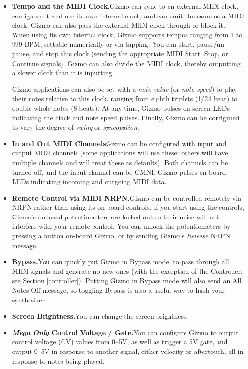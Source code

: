 \documentclass{article}
\begin{document}
\begin{itemize}
\item {\bf Tempo and the MIDI Clock.}\quad Gizmo can sync to an external MIDI clock, can ignore it and use its own internal clock, and can emit the same as a MIDI clock.  Gizmo can also pass the external MIDI clock through or block it.  When using its own internal clock, Gizmo supports tempos ranging from 1 to 999 BPM, settable numerically or via tapping.  You can start, pause/un-pause, and stop this clock (sending the appropriate MIDI Start, Stop, or Continue signals).  Gizmo can also divide the MIDI clock, thereby outputting a slower clock than it is inputting.

Gizmo applications can also be set with a {\it note value} (or {\it note speed}) to play their notes relative to this clock, ranging from eighth triplets (1/24 beat) to double whole notes (8 beats).  At any time, Gizmo pulses on-screen LEDs indicating the clock and note speed pulses.  Finally, Gizmo can be configured to vary the degree of {\it swing} or {\it syncopation}.

\item {\bf In and Out MIDI Channels}\quad Gizmo can be configured with input and output MIDI channels (some applications will use these: others will have multiple channels and will treat these as defaults).  Both channels can be turned off, and the input channel can be OMNI.  Gizmo pulses on-board LEDs indicating incoming and outgoing MIDI data.  

\item {\bf Remote Control via MIDI NRPN.}\quad Gizmo can be controlled remotely via NRPN rather than using its on-board controls.  If you start using the controls, Gizmo's onboard potentiometers are locked out so their noise will not interfere with your remote control.  You can unlock the potentiometers by pressing a button on-board Gizmo, or by sending Gizmo's {\it Release} NRPN message.

\item {\bf Bypass.}\quad You can quickly put Gizmo in Bypass mode, to pass through all MIDI signals and generate no new ones (with the exception of the Controller, see Section \ref{controller}).  Putting Gizmo in Bypass mode will also send an All Notes Off message, so toggling Bypass is also a useful way to hush your synthesizer.

\item {\bf Screen Brightness.}\quad You can change the screen brightness.  

\item {\bf  \textit{Mega Only} Control Voltage / Gate.}\quad You can configure Gizmo to output control voltage (CV) values from 0--5V, as well as trigger a 5V gate, and output 0--5V in response to another signal, either velocity or aftertouch, all in response to notes being played. 


\end{itemize}
\end{document}
